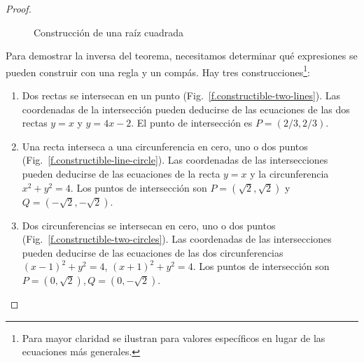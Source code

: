 \begin{proof}
\begin{figure}[b]
\begin{center}
\end{center}
\caption{Construcción de una raíz cuadrada}
\label{f.trisect-square-root}
\end{figure}

Para demostrar la inversa del teorema, necesitamos determinar qué expresiones se pueden construir con una regla y un compás. Hay tres construcciones\footnote{Para mayor claridad se ilustran para valores específicos en lugar de las ecuaciones más generales.}:

\begin{enumerate}
\item Dos rectas se intersecan en un punto (Fig.~\ref{f.constructible-two-lines}). Las coordenadas de la intersección pueden deducirse de las ecuaciones de las dos rectas $y=x$ y $y=4x-2$. El punto de intersección es $P= (2/3, 2/3)$.

\item Una recta interseca a una circunferencia en cero, uno o dos puntos (Fig.~\ref{f.constructible-line-circle}). Las coordenadas de las intersecciones pueden deducirse de las ecuaciones de la recta $y=x$ y la circunferencia $x^2+y^2=4$. Los puntos de intersección son
$P=(\sqrt{2}, \sqrt{2})$ y $Q=(-\sqrt{2}, -\sqrt{2})$.

\item Dos circunferencias se intersecan en cero, uno o dos puntos (Fig.~\ref{f.constructible-two-circles}). Las coordenadas de las intersecciones pueden deducirse de las ecuaciones de las dos circunferencias $(x-1)^2+y^2=4$, $(x+1)^2+y^2=4$. Los puntos de intersección son $P=(0,\sqrt{2}),Q=(0,-\sqrt{2})$.
\end{enumerate}
\end{proof}


